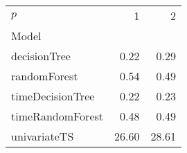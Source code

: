 \begin{tabular}{lrr}
\toprule
$p$ & 1 & 2 \\
Model &  &  \\
\midrule
decisionTree & 0.22 & 0.29 \\
randomForest & 0.54 & 0.49 \\
timeDecisionTree & 0.22 & 0.23 \\
timeRandomForest & 0.48 & 0.49 \\
univariateTS & 26.60 & 28.61 \\
\bottomrule
\end{tabular}
